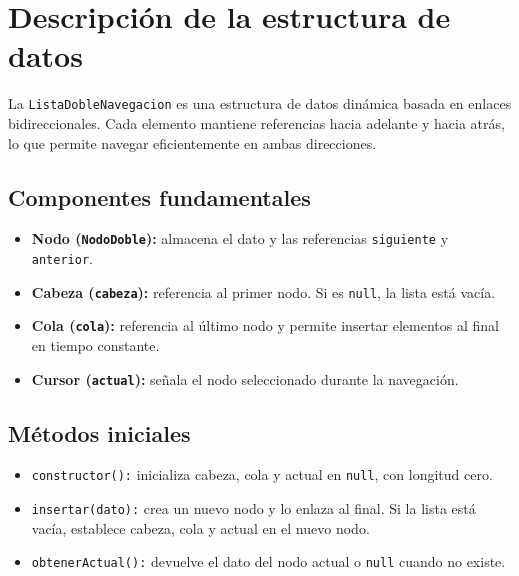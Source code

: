 \documentclass[11pt]{article}
\begin{document}
\section{Descripción de la estructura de datos}

La \texttt{ListaDobleNavegacion} es una estructura de datos
dinámica basada en enlaces bidireccionales. Cada elemento
mantiene referencias hacia adelante y hacia atrás, lo que
permite navegar eficientemente en ambas direcciones.

\subsection*{Componentes fundamentales}

\begin{itemize}[leftmargin=*,nosep]
    \item \textbf{Nodo (\texttt{NodoDoble}):}
    almacena el dato y las referencias
    \texttt{siguiente} y \texttt{anterior}.

    \item \textbf{Cabeza (\texttt{cabeza}):}
    referencia al primer nodo. Si es \texttt{null},
    la lista está vacía.

    \item \textbf{Cola (\texttt{cola}):}
    referencia al último nodo y permite insertar
    elementos al final en tiempo constante.

    \item \textbf{Cursor (\texttt{actual}):}
    señala el nodo seleccionado durante la navegación.
\end{itemize}

\subsection*{Métodos iniciales}

\begin{itemize}[leftmargin=*,nosep]
    \item \texttt{constructor():}
    inicializa cabeza, cola y actual en \texttt{null},
    con longitud cero.

    \item \texttt{insertar(dato):}
    crea un nuevo nodo y lo enlaza al final.
    Si la lista está vacía, establece cabeza,
    cola y actual en el nuevo nodo.

    \item \texttt{obtenerActual():}
    devuelve el dato del nodo actual o
    \texttt{null} cuando no existe.
\end{itemize}
\end{document}
